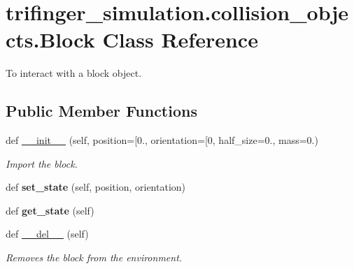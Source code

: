 \hypertarget{classtrifinger__simulation_1_1collision__objects_1_1Block}{}\section{trifinger\+\_\+simulation.\+collision\+\_\+objects.\+Block Class Reference}
\label{classtrifinger__simulation_1_1collision__objects_1_1Block}


To interact with a block object.  


\subsection*{Public Member Functions}
\begin{DoxyCompactItemize}
\item 
def \hyperlink{classtrifinger__simulation_1_1collision__objects_1_1Block_a743f74849e2187fb1d6d40c30081666e}{\+\_\+\+\_\+init\+\_\+\+\_\+} (self, position=\mbox{[}0., orientation=\mbox{[}0, half\+\_\+size=0., mass=0.)
\begin{DoxyCompactList}\small\item\em Import the block. \end{DoxyCompactList}\item 
\mbox{\label{classtrifinger__simulation_1_1collision__objects_1_1Block_aa90bc5d269bed3e8ebf439d2299b6e5a}} 
def {\bfseries set\+\_\+state} (self, position, orientation)
\item 
\mbox{\label{classtrifinger__simulation_1_1collision__objects_1_1Block_acabb3edb761f28e0d5a9e11d056aa233}} 
def {\bfseries get\+\_\+state} (self)
\item 
\mbox{\label{classtrifinger__simulation_1_1collision__objects_1_1Block_a209b09f10231bc479b65e3976233696f}} 
def \hyperlink{classtrifinger__simulation_1_1collision__objects_1_1Block_a209b09f10231bc479b65e3976233696f}{\+\_\+\+\_\+del\+\_\+\+\_\+} (self)
\begin{DoxyCompactList}\small\item\em Removes the block from the environment. \end{DoxyCompactList}\end{DoxyCompactItemize}
